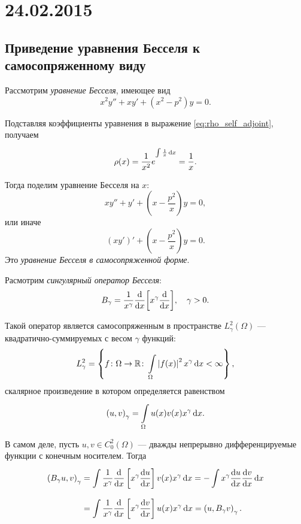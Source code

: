 \section{24.02.2015}
\subsection{Приведение уравнения Бесселя к самосопряженному виду}
Рассмотрим \emph{уравнение Бесселя}, имеющее вид
\[ x^2 y'' + xy' + (x^2 - p^2)y = 0. \]

Подставляя коэффициенты уравнения в выражение \ref{eq:rho_self_adjoint}, получаем
\[ \rho(x) = \frac{1}{x^2} e^{\int\limits_{}^{} \frac{1}{x} \,\mathrm{d}{x}} = \frac{1}{x}. \]

Тогда поделим уравнение Бесселя на $x$:
\[ xy'' + y' + \left(x - \frac{p^2}{x}\right) y = 0, \]
или иначе
\[ (xy')' + \left(x - \frac{p^2}{x}\right) y = 0. \]
Это \emph{уравнение Бесселя в самосопряженной форме}.

Расмотрим \emph{сингулярный оператор Бесселя}:
\[B_\gamma = \frac{1}{x^\gamma} \frac{\mathrm{d}}{\mathrm{d}x}{\left[x^\gamma \frac{\mathrm{d}}{\mathrm{d}x}\right]}, \quad \gamma > 0. \]

Такой оператор является самосопряженным в пространстве $L_\gamma^2(\Omega)$ --- квадратично-суммируемых с весом $\gamma$ функций:
\[ L_\gamma^2 = \left\{ f \colon \Omega \to \mathbb{R} \colon \int\limits_{\Omega}^{} \left|f(x)\right|^2 x^\gamma \,\mathrm{d}{x} < \infty \right\}, \]
скалярное произведение в котором определяется равенством
\[ \left( u, v \right)_\gamma = \int\limits_{\Omega}^{} u(x)v(x) x^\gamma \,\mathrm{d}{x}. \]

В самом деле, пусть $u, v \in C_0^2(\Omega)$ --- дважды непрерывно дифференцируемые функции с конечным носителем. Тогда
\begin{equation*}
\begin{split}
    \left( B_\gamma u, v \right)_\gamma &= \int\limits_{}^{} \frac{1}{x^\gamma} \frac{\mathrm{d}}{\mathrm{d}x}\left[x^\gamma \frac{\mathrm{d}u}{\mathrm{d}x}\right] v(x) x^\gamma \,\mathrm{d}{x} = -\int\limits_{}^{} x^\gamma \frac{\mathrm{d}u}{\mathrm{d}x} \frac{\mathrm{d}v}{\mathrm{d}x} \,\mathrm{d}{x} \\
    &= \int\limits_{}^{} \frac{1}{x^\gamma} \frac{\mathrm{d}}{\mathrm{d}x}\left[x^\gamma \frac{\mathrm{d}v}{\mathrm{d}x}\right] u(x) x^\gamma \,\mathrm{d}{x} = \left( u, B_\gamma v \right)_\gamma.
\end{split}
\end{equation*}

